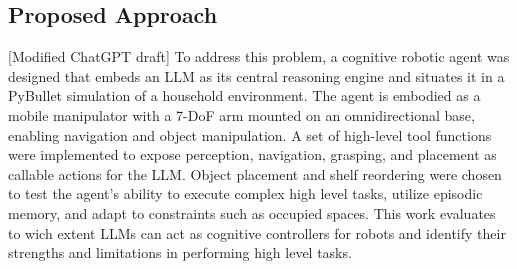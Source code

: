 \documentclass[../report.tex]{subfiles}
\begin{document}
\subsection{Proposed Approach}
\label{sec:introduction:proposed_approach}

[Modified ChatGPT draft]
To address this problem, a cognitive robotic agent was designed that embeds an LLM as its central reasoning engine and situates it in a PyBullet simulation of a household environment. The agent is embodied as a mobile manipulator with a 7-DoF arm mounted on an omnidirectional base, enabling navigation and object manipulation. A set of high-level tool functions were implemented to expose perception, navigation, grasping, and placement as callable actions for the LLM. Object placement and shelf reordering were chosen to test the agent’s ability to execute complex high level tasks, utilize episodic memory, and adapt to constraints such as occupied spaces. This work evaluates to wich extent LLMs can act as cognitive controllers for robots and identify their strengths and limitations in performing high level tasks.
\end{document}
